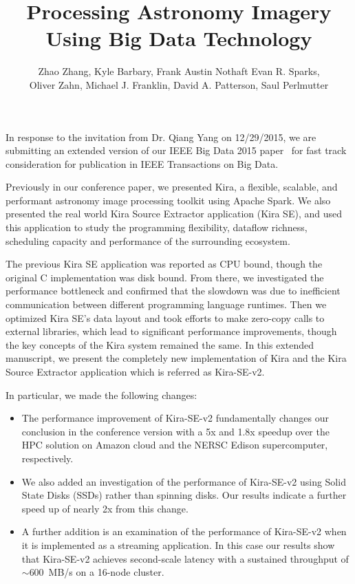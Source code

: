 \documentclass[10pt,a4paper]{article}
\title{Processing Astronomy Imagery Using Big Data Technology}
\author{Zhao Zhang, Kyle Barbary, Frank Austin Nothaft Evan R. Sparks, \\Oliver Zahn, Michael J. Franklin, David A. Patterson, Saul Perlmutter}
\begin{document}
\maketitle
\noindent In response to the invitation from Dr. Qiang Yang on 12/29/2015, we are submitting an extended version of our IEEE Big Data 2015 paper~\cite{zhang2015} for fast track consideration for publication in IEEE Transactions on Big Data.

Previously in our conference paper, we presented Kira, a flexible, scalable, and performant astronomy image processing toolkit using Apache Spark.
We also presented the real world Kira Source Extractor application (Kira SE), and used this application to study the programming flexibility,
dataflow richness, scheduling capacity and performance of the surrounding ecosystem.

The previous Kira SE application was reported as CPU bound, though the original C implementation was disk bound.
From there, we investigated the performance bottleneck and confirmed that the slowdown was due to inefficient communication 
between different programming language runtimes.
Then we optimized Kira SE's data layout and took efforts to make zero-copy calls to external libraries, which lead
to significant performance improvements, though the key concepts of the Kira system remained the same.
In this extended manuscript, we present the completely new implementation of Kira and the Kira Source Extractor application which is referred as Kira-SE-v2.

In particular, we made the following changes:
\begin{itemize}
\item{} The performance improvement of Kira-SE-v2 fundamentally changes our conclusion in the conference version with 
a 5x and 1.8x speedup over the HPC solution on Amazon cloud and the NERSC Edison supercomputer, respectively.
\item{} We also added an investigation of the performance of Kira-SE-v2 using Solid State Disks (SSDs) rather than spinning disks.  
Our results indicate a further speed up of nearly 2x from this change.
\item{} A further addition is an examination of the performance of Kira-SE-v2 when it is implemented as a streaming application.  In this case our results show that Kira-SE-v2 achieves second-scale latency with a sustained throughput of $\sim$600~MB/s on a 16-node cluster.
\end{itemize}
\end{document}
